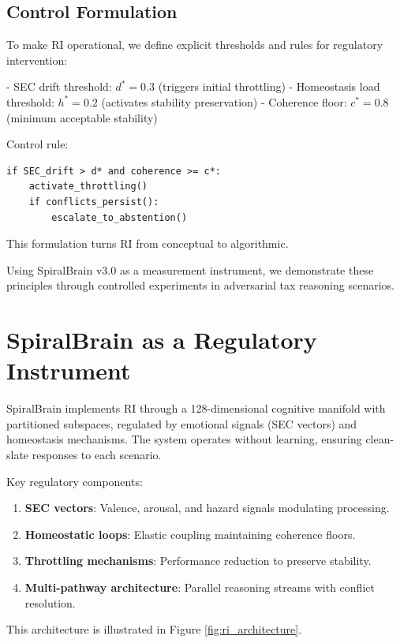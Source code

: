 \documentclass[12pt,a4paper]{article}
\begin{document}
\subsection{Control Formulation}

To make RI operational, we define explicit thresholds and rules for regulatory intervention:

- SEC drift threshold: $d^* = 0.3$ (triggers initial throttling)
- Homeostasis load threshold: $h^* = 0.2$ (activates stability preservation)
- Coherence floor: $c^* = 0.8$ (minimum acceptable stability)

Control rule:
\begin{verbatim}
if SEC_drift > d* and coherence >= c*:
    activate_throttling()
    if conflicts_persist():
        escalate_to_abstention()
\end{verbatim}


This formulation turns RI from conceptual to algorithmic.

Using SpiralBrain v3.0 as a measurement instrument, we demonstrate these principles through controlled experiments in adversarial tax reasoning scenarios.

\section{SpiralBrain as a Regulatory Instrument}

SpiralBrain implements RI through a 128-dimensional cognitive manifold with partitioned subspaces, regulated by emotional signals (SEC vectors) and homeostasis mechanisms. The system operates without learning, ensuring clean-slate responses to each scenario.

Key regulatory components:
\begin{enumerate}
    \item \textbf{SEC vectors}: Valence, arousal, and hazard signals modulating processing.
    \item \textbf{Homeostatic loops}: Elastic coupling maintaining coherence floors.
    \item \textbf{Throttling mechanisms}: Performance reduction to preserve stability.
    \item \textbf{Multi-pathway architecture}: Parallel reasoning streams with conflict resolution.
\end{enumerate}


This architecture is illustrated in Figure \ref{fig:ri_architecture}.
\end{document}
